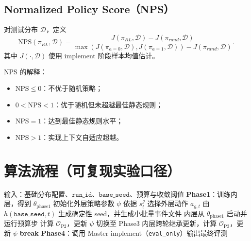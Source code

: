 \documentclass[UTF8,11pt,a4paper]{ctexart}
\begin{document}
\subsection{Normalized Policy Score（NPS）}
对测试分布 \(\mathcal{D}\)，定义
\begin{equation}
\mathrm{NPS}(\pi_{RL},\mathcal{D})
=
\frac{J(\pi_{RL},\mathcal{D})-J(\pi_{rand},\mathcal{D})}
{\max\!\left(J(\pi_{a=0},\mathcal{D}),J(\pi_{a=1},\mathcal{D})\right)-J(\pi_{rand},\mathcal{D})}.
\end{equation}
其中 \(J(\cdot,\mathcal{D})\) 使用 implement 阶段样本均值估计。

NPS 的解释：
\begin{itemize}
\item \(\mathrm{NPS}\le 0\)：不优于随机策略；
\item \(0<\mathrm{NPS}<1\)：优于随机但未超越最佳静态规则；
\item \(\mathrm{NPS}=1\)：达到最佳静态规则水平；
\item \(\mathrm{NPS}>1\)：实现上下文自适应超越。
\end{itemize}

\section{算法流程（可复现实验口径）}
\begin{algorithm}[H]
\caption{NOVA\_EDRL 四阶段训练与评测}
\begin{algorithmic}[1]
\State 输入：基础分布配置、\(\texttt{run\_id}\)、\(\texttt{base\_seed}\)、预算与收敛阈值
\State \textbf{Phase1}：训练内层，得到 \(\theta_{\text{phase1}}\)
\State 初始化外层策略参数 \(\psi\)
  \State 依据 \(s_t^g\) 选择外层动作 \(a_{g,t}\)
  \State 由 \(h(\texttt{base\_seed},t)\) 生成确定性 seed，并生成小批量事件文件
    \State 内层从 \(\theta_{\text{phase1}}\) 启动并运行预算步
    \State 计算 \(\mathcal{O}_{\text{P2}}\)，更新 \(\psi\)
     \State 切换至 Phase3 \EndIf
  \Else
    \State 内层跨轮继承更新，计算 \(\mathcal{O}_{\text{P3}}\)，更新 \(\psi\)
     \State \textbf{break} \EndIf
  \EndIf
\EndFor
\State \textbf{Phase4}：调用 Master implement（\texttt{eval\_only}）输出最终评测
\end{algorithmic}
\end{algorithm}
\end{document}
